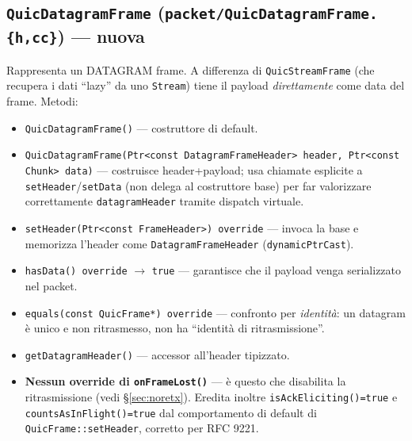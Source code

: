 \documentclass[11pt,a4paper]{article}
\newcommand{\code}[1]{\texttt{#1}}
\begin{document}
\subsection{\code{QuicDatagramFrame} (\code{packet/QuicDatagramFrame.\{h,cc\}}) --- nuova}
Rappresenta un DATAGRAM frame. A differenza di \code{QuicStreamFrame} (che recupera i dati ``lazy'' da uno
\code{Stream}) tiene il payload \emph{direttamente} come data del frame. Metodi:
\begin{itemize}[nosep,leftmargin=1.4em]
  \item \code{QuicDatagramFrame()} --- costruttore di default.
  \item \code{QuicDatagramFrame(Ptr<const DatagramFrameHeader> header, Ptr<const Chunk> data)} ---
    costruisce header+payload; usa chiamate esplicite a \code{setHeader}/\code{setData} (non delega al
    costruttore base) per far valorizzare correttamente \code{datagramHeader} tramite dispatch virtuale.
  \item \code{setHeader(Ptr<const FrameHeader>) override} --- invoca la base e memorizza l'header
    come \code{DatagramFrameHeader} (\code{dynamicPtrCast}).
  \item \code{hasData() override} $\to$ \code{true} --- garantisce che il payload venga serializzato nel packet.
  \item \code{equals(const QuicFrame*) override} --- confronto per \emph{identit\`a}: un datagram \`e unico e
    non ritrasmesso, non ha ``identit\`a di ritrasmissione''.
  \item \code{getDatagramHeader()} --- accessor all'header tipizzato.
  \item \textbf{Nessun override di \code{onFrameLost()}} --- \`e questo che disabilita la ritrasmissione
    (vedi \S\ref{sec:noretx}). Eredita inoltre \code{isAckEliciting()=true} e \code{countsAsInFlight()=true}
    dal comportamento di default di \code{QuicFrame::setHeader}, corretto per RFC 9221.
\end{itemize}
\end{document}
